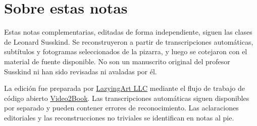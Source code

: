 \documentclass[11pt,oneside]{book}
\begin{document}
\frontmatter
\hypersetup{pageanchor=false}

\hypersetup{pageanchor=true}

\clearpage
\chapter{Sobre estas notas}
Estas notas complementarias, editadas de forma independiente, siguen las clases de Leonard Susskind. Se reconstruyeron a partir de transcripciones automáticas, subtítulos y fotogramas seleccionados de la pizarra, y luego se cotejaron con el material de fuente disponible. No son un manuscrito original del profesor Susskind ni han sido revisadas ni avaladas por él.

La edición fue preparada por \href{https://lazying.art}{LazyingArt LLC} mediante el flujo de trabajo de código abierto \href{https://github.com/lachlanchen/Video2Book}{Video2Book}. Las transcripciones automáticas siguen disponibles por separado y pueden contener errores de reconocimiento. Las aclaraciones editoriales y las reconstrucciones no triviales se identifican en notas al pie.
\clearpage
\tableofcontents
\mainmatter










\end{document}
